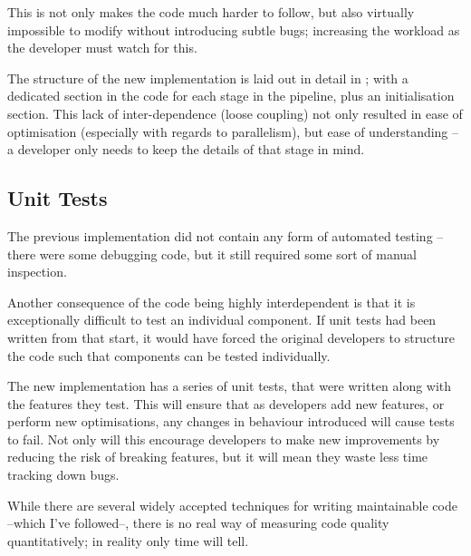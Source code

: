 This is not only makes the code much harder to follow, but also virtually impossible to modify without introducing subtle bugs; increasing the workload as the developer must watch for this.

The structure of the new implementation is laid out in detail in ; with a dedicated section in the code for each stage in the pipeline, plus an initialisation section. This lack of inter-dependence (loose coupling) not only resulted in ease of optimisation (especially with regards to parallelism), but ease of understanding -- a developer only needs to keep the details of that stage in mind.
	
\subsection{Unit Tests}
The previous implementation did not contain any form of automated testing -- there were some debugging code, but it still required some sort of manual inspection.

Another consequence of the code being highly interdependent is that it is exceptionally difficult to test an individual component. If unit tests had been written from that start, it would have forced the original developers to structure the code such that components can be tested individually.

The new implementation has a series of unit tests, that were written along with the features they test. This will ensure that as developers add new features, or perform new optimisations, any changes in behaviour introduced will cause tests to fail. Not only will this encourage developers to make new improvements by reducing the risk of breaking features, but it will mean they waste less time tracking down bugs.


While there are several widely accepted techniques for writing maintainable code --which I've followed--, there is no real way of measuring code quality quantitatively; in reality only time will tell.
